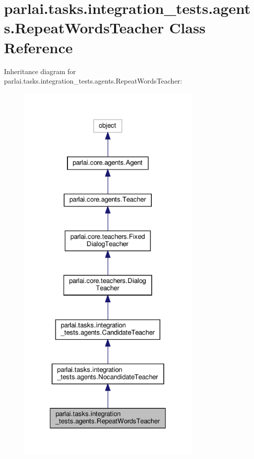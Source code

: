 \hypertarget{classparlai_1_1tasks_1_1integration__tests_1_1agents_1_1RepeatWordsTeacher}{}\section{parlai.\+tasks.\+integration\+\_\+tests.\+agents.\+Repeat\+Words\+Teacher Class Reference}
\label{classparlai_1_1tasks_1_1integration__tests_1_1agents_1_1RepeatWordsTeacher}


Inheritance diagram for parlai.\+tasks.\+integration\+\_\+tests.\+agents.\+Repeat\+Words\+Teacher\+:
\nopagebreak
\begin{figure}[H]
\begin{center}
\leavevmode
\includegraphics[width=254pt]{classparlai_1_1tasks_1_1integration__tests_1_1agents_1_1RepeatWordsTeacher__inherit__graph}
\end{center}
\end{figure}



